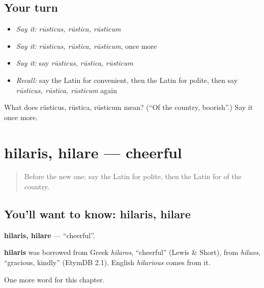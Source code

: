 \subsection*{Your turn}
\begin{itemize}
\raggedright
  \item \emph{Say it:} \emph{rūsticus, rūstica, rūsticum}
  \item \emph{Say it:} \emph{rūsticus, rūstica, rūsticum}, once more
  \item \emph{Say it:} say \emph{rūsticus, rūstica, rūsticum}
  \item \emph{Recall:} say the Latin for convenient, then the Latin for polite, then say \emph{rūsticus, rūstica, rūsticum} again
\end{itemize}

\begin{tcolorbox}[breakable,colback=teal!4,colframe=teal!35!black,title={Before you move on}]
What does rūsticus, rūstica, rūsticum mean? (\textquotedblleft{}Of the country, boorish\textquotedblright{}.) Say it once more.
\end{tcolorbox}
\section[hilaris, hilare]{hilaris, hilare — cheerful}

\label{lesson:LA-C180-hilaris}



\begin{quote}
Before the new one: say the Latin for polite, then the Latin for of the country.
\end{quote}

\subsection*{You'll want to know: hilaris, hilare}
\textbf{hilaris, hilare} — \textquotedblleft{}cheerful\textquotedblright{}.

\begin{cousinweb}
\textbf{hilaris} was borrowed from Greek \emph{hilaros}, \textquotedblleft{}cheerful\textquotedblright{} (Lewis \& Short), from \emph{hilaos}, \textquotedblleft{}gracious, kindly\textquotedblright{} (EtymDB 2.1). English \emph{hilarious} comes from it.
\end{cousinweb}

\begin{grammarlens}[title={What you've built}]
One more word for this chapter.
\end{grammarlens}

